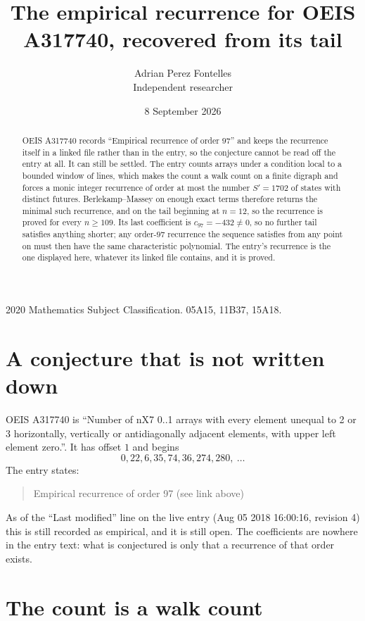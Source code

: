 \documentclass[11pt,a4paper]{article}
\title{The empirical recurrence for OEIS A317740, recovered from its tail}
\author{Adrian Perez Fontelles\\ \small Independent researcher}
\date{8 September 2026}
\theoremstyle{plain}
\theoremstyle{definition}
\begin{document}
\maketitle

\begin{abstract}
OEIS A317740 records ``Empirical recurrence of order $97$'' and keeps the recurrence itself in
a linked file rather than in the entry, so the conjecture cannot be read off the entry at all.
It can still be settled. The entry counts arrays under a condition local to a bounded window of
lines, which makes the count a walk count on a finite digraph and forces a monic integer
recurrence of order at most the number $S'=1702$ of states with distinct futures. Berlekamp--Massey on
enough exact terms therefore returns the minimal such recurrence, and on the tail beginning at $n=12$, so the recurrence is proved for every $n\ge109$.
Its last coefficient is $c_{97}=-432\neq0$, so no further tail satisfies anything
shorter; any order-$97$ recurrence the sequence satisfies from any point on must then have
the same characteristic polynomial. The entry's recurrence is the one displayed here, whatever
its linked file contains, and it is proved.
\end{abstract}

\noindent\small 2020 Mathematics Subject Classification. 05A15, 11B37, 15A18.\normalsize

\section{A conjecture that is not written down}

OEIS A317740 is ``Number of nX7 0..1 arrays with every element unequal to 2 or 3 horizontally, vertically or antidiagonally adjacent elements, with upper left element zero.''. It has offset $1$ and begins
\[
0, 22, 6, 35, 74, 36, 274, 280,\ \dots
\]
The entry states:
\begin{quote}
Empirical recurrence of order 97 (see link above)
\end{quote}
As of the ``Last modified'' line on the live entry (Aug 05 2018 16:00:16, revision 4)
this is still recorded as empirical, and it is still open. The coefficients are nowhere in the
entry text: what is conjectured is only that a recurrence of that order exists.

\section{The count is a walk count}
\end{document}
